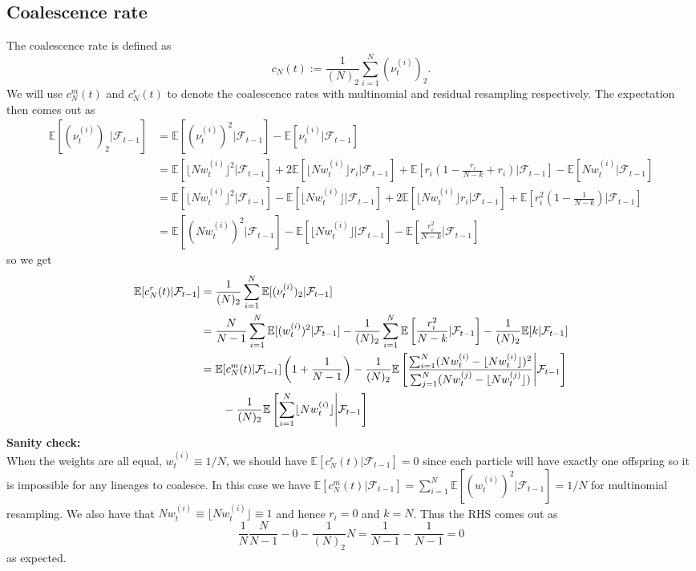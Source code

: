 \documentclass[fleqn]{article}
\theoremstyle{definition}
\newcommand{\E}{\mathbb{E}}
\newcommand{\F}{\mathcal{F}_{t-1}}
\newcommand{\vt}[2][t]{\nu_{#1}^{(#2)}}
\newcommand{\wt}[2][t]{w_{#1}^{(#2)}}
\begin{document}
\subsection{Coalescence rate}
The coalescence rate is defined as
\begin{equation*}
c_N(t) := \frac{1}{(N)_2} \sum_{i=1}^{N} (\vt{i})_2.
\end{equation*}
We will use $c_N^m(t)$ and $c_N^r(t)$ to denote the coalescence rates with multinomial and residual resampling respectively.
The expectation then comes out as
\begin{align*}
\E[(\vt{i})_2 |\F] &= \E[(\vt{i})^2 |\F] - \E[\vt{i} |\F] \\
&= \E[\lfloor N\wt{i} \rfloor^2 |\F] + 2 \E[\lfloor N\wt{i} \rfloor r_i |\F] + \E\left[ r_i \left(1 - \frac{r_i}{N-k} + r_i \right) |\F \right] - \E[N\wt{i} |\F] \\
&=\E[ \lfloor N\wt{i} \rfloor^2 |\F] - \E[ \lfloor N\wt{i} \rfloor |\F] + 2 \E[ \lfloor N\wt{i} \rfloor r_i |\F] + \E\left[ r_i^2 \left(1- \frac{1}{N-k} \right) |\F\right] \\
&= \E[ (N\wt{i})^2 |\F] - \E[ \lfloor N\wt{i} \rfloor |\F] - \E\left[ \frac{r_i^2}{N-k} |\F \right]
\end{align*}
so we get
\begin{align}
\E[c^r_N(t) |\F] &=  \frac{1}{(N)_2}  \sum_{i=1}^{N} \E[(\vt{i})_2 |\F ]\notag\\
&= \frac{N}{N-1} \sum_{i=1}^{N} \E[(\wt{i})^2 |\F] - \frac{1}{(N)_2} \sum_{i=1}^{N} \E\left[ \frac{r_i^2}{N-k} |\F \right] - \frac{1}{(N)_2} \E[k |\F] \notag\\
&= \E[c^{m}_N(t) |\F] \left( 1 + \frac{1}{N-1} \right) - \frac{1}{(N)_2}  \E\left[ \frac{\sum_{i=1}^{N} (N\wt{i} - \lfloor N\wt{i}\rfloor)^2}{\sum_{j=1}^{N} (N\wt{j} - \lfloor N\wt{j}\rfloor)} \middle|\F \right] \notag\\
&\qquad -\frac{1}{(N)_2} \E \left[ \sum_{i=1}^{N} \lfloor N\wt{i}\rfloor \middle|\F \right]
\label{eq:cNt_1}
\end{align}
\textbf{Sanity check:}\\
When the weights are all equal, $\wt{i} \equiv 1/N$, we should have $\E[c^r_N(t) |\F] = 0$ since each particle will have exactly one offspring so it is impossible for any lineages to coalesce. In this case we have $\E[c^{m}_N(t) |\F] = \sum_{i=1}^{N} \E[(\wt{i})^2 |\F] = 1/N$ for multinomial resampling. We also have that $N\wt{i} \equiv \lfloor N\wt{i} \rfloor \equiv 1$ and hence $r_i = 0$ and $k=N$. Thus the RHS comes out as
\begin{equation*}
\frac{1}{N}\frac{N}{N-1} - 0 - \frac{1}{(N)_2} N = \frac{1}{N-1} - \frac{1}{N-1} = 0
\end{equation*}
as expected.\\
\end{document}
